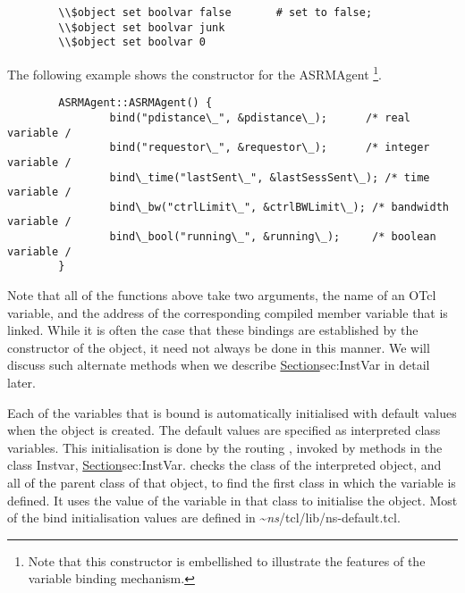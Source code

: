 \begin{itemize}
\begin{verbatim}
        \\$object set boolvar false       # set to false;
        \\$object set boolvar junk        
        \\$object set boolvar 0
        \end{verbatim}

\end{itemize}

The following example shows the constructor for the ASRMAgent%
\footnote{Note that this constructor is embellished to illustrate
        the features of the variable binding mechanism.}.
\begin{verbatim}
        ASRMAgent::ASRMAgent() {
                bind("pdistance\_", &pdistance\_);      /* real variable /
                bind("requestor\_", &requestor\_);      /* integer variable /
                bind\_time("lastSent\_", &lastSessSent\_); /* time variable /
                bind\_bw("ctrlLimit\_", &ctrlBWLimit\_); /* bandwidth variable /
                bind\_bool("running\_", &running\_);     /* boolean variable /
        }
\end{verbatim}
Note that all of the functions above take two arguments,
the name of an OTcl variable,
and the address of the corresponding compiled member variable
that is linked.
While it is often the case that these bindings are established
by the constructor of the object, 
it need not always be done in this manner.
We will discuss such alternate methods
when we describe \href{the class InstVar}{Section}{sec:InstVar}
in detail later.

Each of the variables that is bound is automatically initialised
with default values when the object is created.
The default values are specified as interpreted class variables.
This initialisation is done by the routing ,
invoked by methods in the class Instvar,
\href{described later}{Section}{sec:InstVar}.
 checks the class of the interpreted object,
and all of the parent class of that object, to find the first
class in which the variable is defined.
It uses the value of the variable in that class to initialise the object.
Most of the bind initialisation values are defined in
\textasciitilde\emph{ns}/{tcl/lib/ns-default.tcl}.

